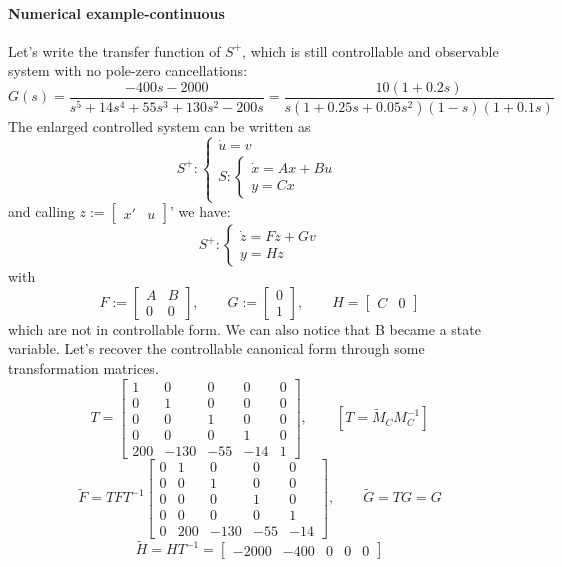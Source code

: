 \paragraph{Numerical example-continuous}
Let's write the transfer function of $S^+$, which is still controllable and observable system with no pole-zero cancellations: \[
G(s)=\frac{-400s-2000}{s^5+14s^4+55s^3+130s^2-200s}=\frac{10(1+0.2s)}{s(1+0.25s+0.05s^2)(1-s)(1+0.1s)}
\]
The enlarged controlled system can be written as
\[
S^+:\begin{cases}
	\dot{u}=v\\
	S:\begin{cases}
		\dot{x}=Ax+Bu\\
		y=Cx
	\end{cases}
\end{cases}
\]
and calling $z:=\begin{bmatrix}
	x' & u
\end{bmatrix}$' we have:
\[
S^+:\begin{cases}
	\dot{z}=Fz+Gv\\
	y=Hz
\end{cases}
\]
with \[
F:=\begin{bmatrix}
	A & B \\ 0 & 0
\end{bmatrix}, \qquad G:=\begin{bmatrix}
0 \\ 1
\end{bmatrix},\qquad H=\begin{bmatrix}
C & 0
\end{bmatrix}
\] which are not in controllable form. We can also notice that B became a state variable. Let's recover the controllable canonical form through some transformation matrices.
\[
	T=\begin{bmatrix}
		1 & 0 & 0 & 0 & 0 \\
		0 & 1 & 0 & 0 & 0 \\
		0 & 0 & 1 & 0 & 0 \\
		0 & 0 & 0 & 1 & 0 \\
		200 & -130 & -55 & -14 & 1
	\end{bmatrix},\qquad [T=\tilde{M}_CM_C^{-1}]
\]
\[
	\tilde{F}=TFT^{-1}\begin{bmatrix}
	0 & 1 & 0 & 0 & 0 \\
	0 & 0 & 1 & 0 & 0 \\
	0 & 0 & 0 & 1 & 0 \\
	0 & 0 & 0 & 0 & 1 \\
	0 &200 & -130 & -55 & -14 
\end{bmatrix},\qquad  \tilde{G}=TG=G
\]
\[\tilde{H}=HT^{-1}=\begin{bmatrix}
	-2000 & -400 & 0 & 0 & 0
\end{bmatrix}\]


